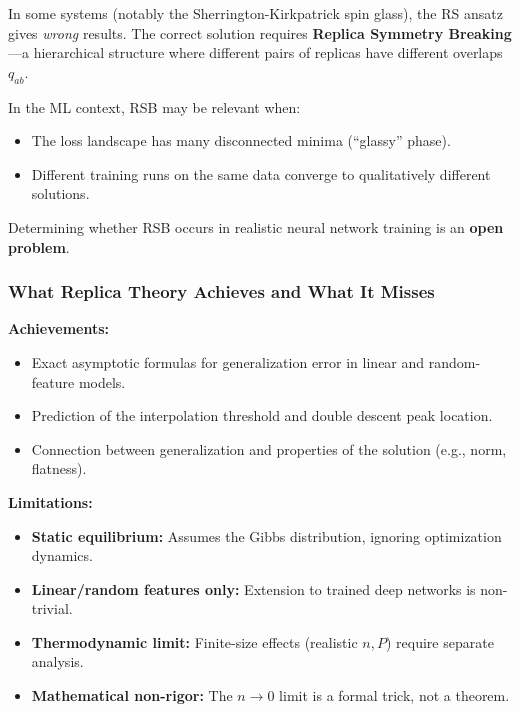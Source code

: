 \documentclass[
  journal=largetwo,
  simfonts=false,
  year=2025,
  volume=37,
]{cup-journal}
\begin{document}
\begin{remark}
In some systems (notably the Sherrington-Kirkpatrick spin glass), the RS ansatz gives \textit{wrong} results. The correct solution requires \textbf{Replica Symmetry Breaking}---a hierarchical structure where different pairs of replicas have different overlaps $q_{ab}$.

In the ML context, RSB may be relevant when:
\begin{itemize}
    \item The loss landscape has many disconnected minima (``glassy'' phase).
    \item Different training runs on the same data converge to qualitatively different solutions.
\end{itemize}

Determining whether RSB occurs in realistic neural network training is an \textbf{open problem}.
\end{remark}

\subsubsection{What Replica Theory Achieves and What It Misses}

\textbf{Achievements:}
\begin{itemize}
    \item Exact asymptotic formulas for generalization error in linear and random-feature models.
    \item Prediction of the interpolation threshold and double descent peak location.
    \item Connection between generalization and properties of the solution (e.g., norm, flatness).
\end{itemize}

\textbf{Limitations:}
\begin{itemize}
    \item \textbf{Static equilibrium:} Assumes the Gibbs distribution, ignoring optimization dynamics.
    \item \textbf{Linear/random features only:} Extension to trained deep networks is non-trivial.
    \item \textbf{Thermodynamic limit:} Finite-size effects (realistic $n, P$) require separate analysis.
    \item \textbf{Mathematical non-rigor:} The $n \to 0$ limit is a formal trick, not a theorem.
\end{itemize}
\end{document}
